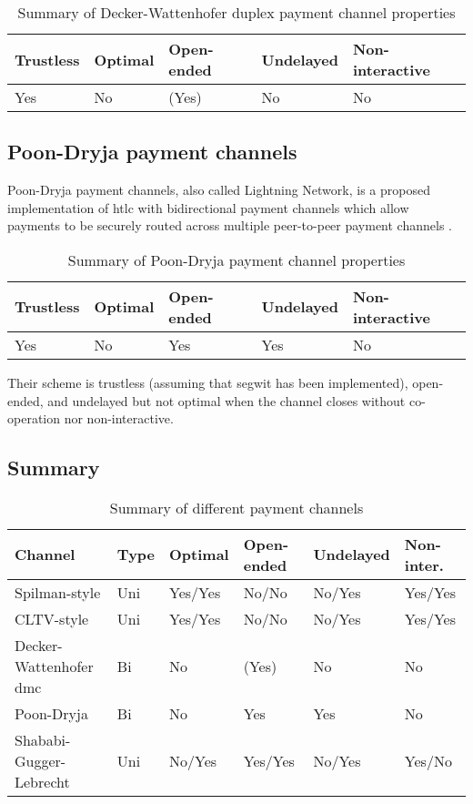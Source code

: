 \documentclass{llncs}
\begin{document}
\begin{table}[h]
  \begin{tabularx}{\textwidth}{ | X | l | l | l | X |}
  \hline
  Trustless & Optimal & Open-ended & Undelayed & Non-interactive \\
  \hline \hline
  Yes & No & (Yes) & No & No \\
  \hline
  \end{tabularx}
  \caption{Summary of Decker-Wattenhofer duplex payment channel properties}
  \label{fig:summaryDeckerWattenhoferPaymentChannel}
\end{table}

\subsection{Poon-Dryja payment channels}

Poon-Dryja payment channels, also called Lightning Network, is a proposed implementation of \gls{htlc} with bidirectional payment channels which allow payments to be securely routed across multiple peer-to-peer payment channels \cite{poon2016bitcoin}.

\begin{table}[h]
  \begin{tabularx}{\textwidth}{ | X | l | l | l | X |}
  \hline
  Trustless & Optimal & Open-ended & Undelayed & Non-interactive \\
  \hline \hline
  Yes & No & Yes & Yes & No \\
  \hline
  \end{tabularx}
  \caption{Summary of Poon-Dryja payment channel properties}
  \label{fig:summaryPoonDryjaPaymentChannel}
\end{table}

Their scheme is trustless (assuming that \gls{segwit} has been implemented), open-ended, and undelayed but not optimal when the channel closes without co-operation nor non-interactive.

\subsection{Summary}

\begin{table}[h]
  \begin{tabularx}{\textwidth}{ | X | l | l | l | l | l |}
  \hline
  Channel & Type & Optimal & Open-ended & Undelayed & Non-inter. \\
  \hline \hline
  Spilman-style & Uni & Yes/Yes & No/No & No/Yes & Yes/Yes \\ \hline
  CLTV-style & Uni & Yes/Yes & No/No & No/Yes & Yes/Yes \\ \hline
  Decker-Wattenhofer \gls{dmc} & Bi & No & (Yes) & No & No \\ \hline
  Poon-Dryja & Bi & No & Yes & Yes & No \\ \hline
  Shababi-Gugger-Lebrecht & Uni & No/Yes & Yes/Yes & No/Yes & Yes/No \\
  \hline
  \end{tabularx}
  \caption{Summary of different payment channels}
  \label{fig:summaryPaymentChannel}
\end{table}
\end{document}
